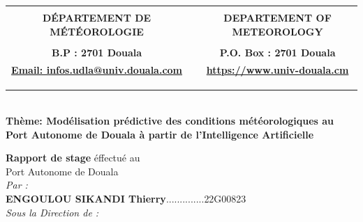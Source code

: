 \documentclass[a4paper,12pt]{article}
\begin{document}
\begin{titlepage}
\begin{adjustbox}{scale=0.6}
\begin{tabular}{ccc}
	\multicolumn{3}{c}{}\\
	\textbf{DÉPARTEMENT DE MÉTÉOROLOGIE} & & \textbf{DEPARTEMENT OF METEOROLOGY}\\
	
	\multicolumn{3}{c}{}\\
	\textbf{B.P : 2701 Douala} & & \textbf{P.O. Box : 2701 Douala} \\ 
	\textbf{\url{Email: infos.udla@univ.douala.com}} & & \textbf{\url{https://www.univ-douala.cm}} \\ 
	
	\multicolumn{3}{c}{}\\
	\multicolumn{3}{c}{}\\
	\multicolumn{3}{c}{}\\
	
\end{tabular}
\end{adjustbox}
\begin{center}
	\\
	{\LARGE \textbf{Thème: Modélisation prédictive des conditions météorologiques au Port Autonome de Douala à partir de l'Intelligence Artificielle}}\
	\noindent \normalsize {{\large \textbf{Rapport de stage }  } éffectué au\\}
	\noindent \normalsize {Port Autonome de Douala  \\}
	\noindent \normalsize \textit{Par :\\}
	\vspace{\stretch{2}}
	\noindent \Large \textbf{ENGOULOU SIKANDI Thierry}..............\normalsize{22G00823} \\
	\vspace{\stretch{2}}
	\noindent \normalsize \textit{Sous la Direction de : \\}
	

\end{center}
\end{titlepage}
\end{document}
